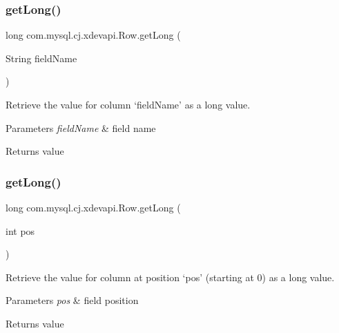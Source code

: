 \subsubsection{\texorpdfstring{get\+Long()}{getLong()}\hspace{0.1cm}{\footnotesize\ttfamily [1/2]}}
{\footnotesize\ttfamily long com.\+mysql.\+cj.\+xdevapi.\+Row.\+get\+Long (\begin{DoxyParamCaption}\item[{String}]{field\+Name }\end{DoxyParamCaption})}

Retrieve the value for column `field\+Name' as a long value.


\begin{DoxyParams}{Parameters}
{\em field\+Name} & field name \\
\hline
\end{DoxyParams}
\begin{DoxyReturn}{Returns}
value 
\end{DoxyReturn}
\mbox{\label{interfacecom_1_1mysql_1_1cj_1_1xdevapi_1_1_row_a3c05d4e3c6f11dea6c023d046f645a46}} 
\subsubsection{\texorpdfstring{get\+Long()}{getLong()}\hspace{0.1cm}{\footnotesize\ttfamily [2/2]}}
{\footnotesize\ttfamily long com.\+mysql.\+cj.\+xdevapi.\+Row.\+get\+Long (\begin{DoxyParamCaption}\item[{int}]{pos }\end{DoxyParamCaption})}

Retrieve the value for column at position `pos' (starting at 0) as a long value.


\begin{DoxyParams}{Parameters}
{\em pos} & field position \\
\hline
\end{DoxyParams}
\begin{DoxyReturn}{Returns}
value 
\end{DoxyReturn}
\mbox{\label{interfacecom_1_1mysql_1_1cj_1_1xdevapi_1_1_row_ad6611c8fb8933ac81f42d6b74ce55a4d}} 

